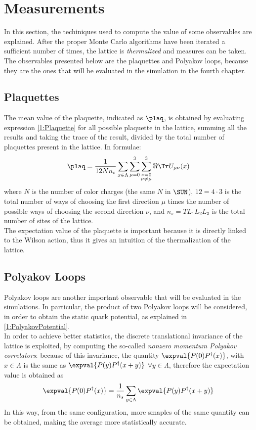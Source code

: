 \section{Measurements}
In this section, the techiniques used to compute the value of some observables are explained.
After the proper Monte Carlo algorithms have been iterated a sufficient number of times, the lattice is \emph{thermalized} and measures can be taken.
The observables presented below are the plaquettes and Polyakov loops, because they are the ones that will be evaluated in the simulation in the fourth chapter.

\subsection{Plaquettes}
The mean value of the plaquette, indicated as $\plaq$, is obtained by evaluating expression \eqref{1:Plaquette} for all possible plaquette in the lattice, summing all the results and taking the trace of the result, divided by the total number of plaquettes present in the lattice.
In formulae:
\begin{equation}
    \plaq = \frac{1}{12 N n_s} \sum_{x\in\Lambda} \sum_{\mu=0}^3 \sum_{\substack{\nu=0 \\ \nu\neq\mu}}^3 \Re\Tr U_{\mu\nu}(x) \label{2:LatticePlaquette}
\end{equation}
where $N$ is the number of color charges (the same $N$ in $\SUN$), $12=4\cdot3$ is the total number of ways of choosing the first direction $\mu$ times the number of possible ways of choosing the second direction $\nu$, and $n_s=TL_1L_2L_3$ is the total number of sites of the lattice.\\
The expectation value of the plaquette is important because it is directly linked to the Wilson action, thus it gives an intuition of the thermalization of the lattice.

\subsection{Polyakov Loops}
Polyakov loops are another important observable that will be evaluated in the simulations.
In particular, the product of two Polyakov loops will be considered, in order to obtain the static quark potential, as explained in \eqref{1:PolyakovPotential}.\\
In order to achieve better statistics, the discrete translational invariance of the lattice is exploited, by computing the so-called \emph{nonzero momentum Polyakov correlators}:
because of this invariance, the quantity $\expval{P(0)P^\dagger(x)}$, with $x\in\Lambda$ is the same as $\expval{P(y)P^\dagger(x+y)}$ $\forall y\in\Lambda$, therefore the expectation value is obtained as
\begin{equation}
    \expval{P(0)P^\dagger(x)} = \frac{1}{n_s} \sum_{y\in\Lambda} \expval{P(y)P^\dagger(x+y)} \label{2:nonzeroMomPolyakov}
\end{equation}
In this way, from the same configuration, more smaples of the same quantity can be obtained, making the average more statistically accurate.

